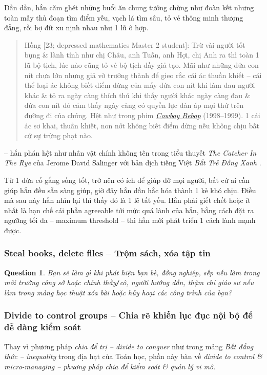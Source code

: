 \documentclass[12pt]{article}
\newtheorem{question}{Question}
\begin{document}
Dần dần, hắn căm ghét những buổi ăn chung tưởng chừng như đoàn kết nhưng toàn mấy thủ đoạn tìm điểm yếu, vạch lá tìm sâu, tỏ vẻ thông minh thượng đẳng, rồi bợ đít xu nịnh nhau như 1 lũ ô hợp.
\begin{quote}
	{\sf Hồng [23; depressed mathematics Master 2 student]}: Trừ vài người tốt bụng \& lành tính như chị Châu, anh Tuấn, anh Hợi, chị Anh ra thì toàn 1 lũ bộ tịch, lúc nào cũng tỏ vẻ bộ tịch đầy giả tạo. Mãi như những đứa con nít chưa lớn nhưng giả vờ trưởng thành để gieo rắc cái ác thuần khiết -- cái thể loại ác không biết điểm dừng của mấy đứa con nít khi làm đau người khác \& tỏ ra ngày càng thích thú khi thấy người khác ngày càng đau \& đứa con nít đó cảm thấy ngày càng có quyền lực đàn áp mọi thứ trên đường đi của chúng. Hệt như trong phim \href{https://www.imdb.com/title/tt0213338/}{\it Cowboy Bebop} (1998--1999). 1 cái ác sơ khai, thuần khiết, non nớt không biết điểm dừng nếu không chịu bất cứ sự trừng phạt nào.
\end{quote}
-- hắn phán hệt như nhân vật chính không tên trong tiểu thuyết {\it The Catcher In The Rye} \cite{Salinger_catcher_in_rye} của {\sc Jerome David Salinger} với bản dịch tiếng Việt {\it Bắt Trẻ Đồng Xanh} \cite{Salinger_btdx}.

Từ 1 đứa cố gắng sống tốt, trở nên có ích để giúp đỡ mọi người, bất cứ ai cần giúp hắn đều sẵn sàng giúp, giờ đây hắn dần hắc hóa thành 1 kẻ khó chịu. Điều mà sau này hắn nhìn lại thì thấy đó là 1 lẽ tất yếu. Hắn phải giết chết hoặc ít nhất là hạn chế cái phần agreeable tới mức quá lành của hắn, bằng cách đặt ra ngưỡng tối đa -- maximum threshold -- thì hắn mới phát triển 1 cách lành mạnh được.

\subsubsection{Steal books, delete files -- Trộm sách, xóa tập tin}

\begin{question}
	Bạn sẽ làm gì khi phát hiện bạn bè, đồng nghiệp, sếp nếu làm trong môi trường công sở hoặc chính thầy{\tt/}cô, người hướng dẫn, thậm chí giáo sư nếu làm trong mảng học thuật xóa bài hoặc hủy hoại các công trình của bạn?
\end{question}

\subsubsection{Divide to control groups -- Chia rẽ khiến lục đục nội bộ để dễ dàng kiểm soát}
Thay vì phương pháp {\it chia để trị -- divide to conquer} như trong mảng {\it Bất đẳng thức -- inequality} trong địa hạt của Toán học, phần này bàn về {\it divide to control \& micro-managing -- phương pháp chia để kiểm soát \& quản lý vi mô}.
\end{document}
